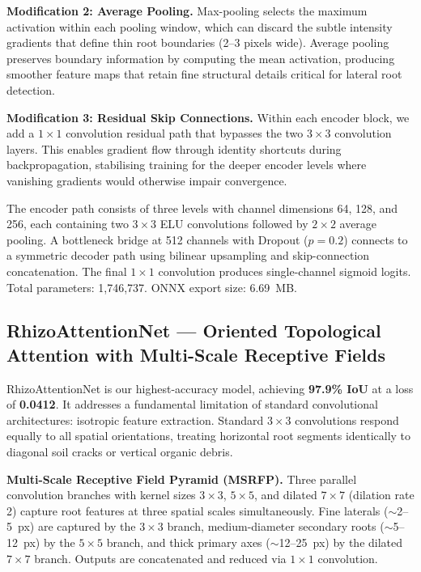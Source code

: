 \documentclass[final,3p,times,nonatbib]{elsarticle}
\begin{document}
\textbf{Modification 2: Average Pooling.} Max-pooling selects the maximum activation within each pooling window, which can discard the subtle intensity gradients that define thin root boundaries (2--3 pixels wide). Average pooling preserves boundary information by computing the mean activation, producing smoother feature maps that retain fine structural details critical for lateral root detection.

\textbf{Modification 3: Residual Skip Connections.} Within each encoder block, we add a $1 \times 1$ convolution residual path that bypasses the two $3 \times 3$ convolution layers. This enables gradient flow through identity shortcuts during backpropagation, stabilising training for the deeper encoder levels where vanishing gradients would otherwise impair convergence.

The encoder path consists of three levels with channel dimensions 64, 128, and 256, each containing two $3 \times 3$ ELU convolutions followed by $2 \times 2$ average pooling. A bottleneck bridge at 512 channels with Dropout ($p = 0.2$) connects to a symmetric decoder path using bilinear upsampling and skip-connection concatenation. The final $1 \times 1$ convolution produces single-channel sigmoid logits. Total parameters: 1,746,737. ONNX export size: 6.69~MB.


\subsection{RhizoAttentionNet --- Oriented Topological Attention with Multi-Scale Receptive Fields}
RhizoAttentionNet is our highest-accuracy model, achieving \textbf{97.9\% IoU} at a loss of \textbf{0.0412}. It addresses a fundamental limitation of standard convolutional architectures: isotropic feature extraction. Standard $3 \times 3$ convolutions respond equally to all spatial orientations, treating horizontal root segments identically to diagonal soil cracks or vertical organic debris.

\textbf{Multi-Scale Receptive Field Pyramid (MSRFP).} Three parallel convolution branches with kernel sizes $3 \times 3$, $5 \times 5$, and dilated $7 \times 7$ (dilation rate 2) capture root features at three spatial scales simultaneously. Fine laterals ($\sim$2--5~px) are captured by the $3 \times 3$ branch, medium-diameter secondary roots ($\sim$5--12~px) by the $5 \times 5$ branch, and thick primary axes ($\sim$12--25~px) by the dilated $7 \times 7$ branch. Outputs are concatenated and reduced via $1 \times 1$ convolution.
\end{document}

